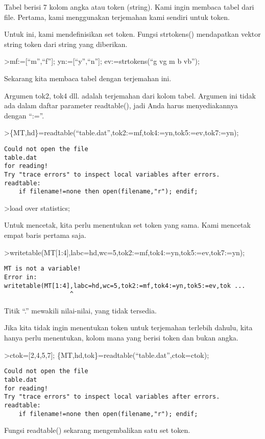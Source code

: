 \documentclass[
]{book}
\begin{document}
Tabel berisi 7 kolom angka atau token (string). Kami ingin membaca tabel dari file. Pertama, kami menggunakan terjemahan kami sendiri untuk token.

Untuk ini, kami mendefinisikan set token. Fungsi strtokens() mendapatkan vektor string token dari string yang diberikan.

\textgreater mf:={[}``m'',``f''{]}; yn:={[}``y'',``n''{]}; ev:=strtokens(``g vg m b vb'');

Sekarang kita membaca tabel dengan terjemahan ini.

Argumen tok2, tok4 dll. adalah terjemahan dari kolom tabel. Argumen ini tidak ada dalam daftar parameter readtable(), jadi Anda harus menyediakannya dengan ``:=''.

\textgreater\{MT,hd\}=readtable(``table.dat'',tok2:=mf,tok4:=yn,tok5:=ev,tok7:=yn);

\begin{verbatim}
Could not open the file
table.dat
for reading!
Try "trace errors" to inspect local variables after errors.
readtable:
    if filename!=none then open(filename,"r"); endif;
\end{verbatim}

\textgreater load over statistics;

Untuk mencetak, kita perlu menentukan set token yang sama. Kami mencetak empat baris pertama saja.

\textgreater writetable(MT{[}1:4{]},labc=hd,wc=5,tok2:=mf,tok4:=yn,tok5:=ev,tok7:=yn);

\begin{verbatim}
MT is not a variable!
Error in:
writetable(MT[1:4],labc=hd,wc=5,tok2:=mf,tok4:=yn,tok5:=ev,tok ...
                  ^
\end{verbatim}

Titik ``.'' mewakili nilai-nilai, yang tidak tersedia.

Jika kita tidak ingin menentukan token untuk terjemahan terlebih dahulu, kita hanya perlu menentukan, kolom mana yang berisi token dan bukan angka.

\textgreater ctok={[}2,4,5,7{]}; \{MT,hd,tok\}=readtable(``table.dat'',ctok=ctok);

\begin{verbatim}
Could not open the file
table.dat
for reading!
Try "trace errors" to inspect local variables after errors.
readtable:
    if filename!=none then open(filename,"r"); endif;
\end{verbatim}

Fungsi readtable() sekarang mengembalikan satu set token.
\end{document}
